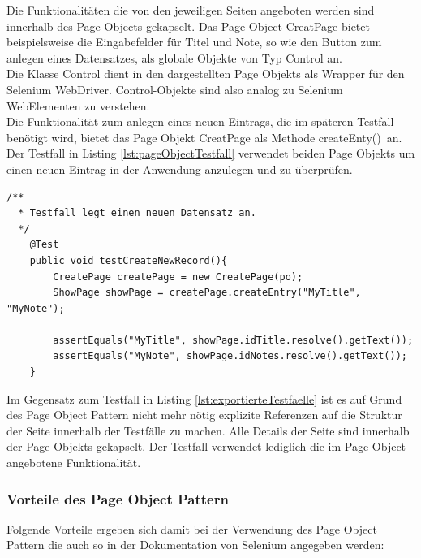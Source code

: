 Die Funktionalitäten die von den jeweiligen Seiten angeboten werden sind innerhalb des Page Objects gekapselt. Das Page Object CreatPage bietet beispielsweise die Eingabefelder für Titel und Note, so wie den Button zum anlegen eines Datensatzes, als globale Objekte von Typ Control an.\\
Die Klasse Control dient in den dargestellten Page Objekts als Wrapper für den Selenium WebDriver. Control-Objekte sind also analog zu Selenium WebElementen zu verstehen.\\
Die Funktionalität zum anlegen eines neuen Eintrags, die im späteren Testfall benötigt wird, bietet das Page Objekt CreatPage als Methode \grq createEnty()\grq\ an.\\

Der Testfall in Listing \ref{lst:pageObjectTestfall} verwendet beiden Page Objekts um einen neuen Eintrag in der Anwendung anzulegen und zu überprüfen.


\begin{lstlisting}[caption={Page Object Testfall},label={lst:pageObjectTestfall}]  
  /**
  * Testfall legt einen neuen Datensatz an.
  */
 	@Test
	public void testCreateNewRecord(){
		CreatePage createPage = new CreatePage(po);
		ShowPage showPage = createPage.createEntry("MyTitle", "MyNote");

		assertEquals("MyTitle", showPage.idTitle.resolve().getText());
		assertEquals("MyNote", showPage.idNotes.resolve().getText());
	}

\end{lstlisting}

Im Gegensatz zum Testfall in Listing \ref{lst:exportierteTestfaelle} ist es auf Grund des Page Object Pattern nicht mehr nötig explizite Referenzen auf die Struktur der Seite innerhalb der Testfälle zu machen. Alle Details der Seite sind innerhalb der Page Objekts gekapselt. Der Testfall verwendet lediglich die im Page Object angebotene Funktionalität.


\subsubsection{Vorteile des Page Object Pattern}
\label{sec:vorteile_des_page_object_pattern}

Folgende Vorteile ergeben sich damit bei der Verwendung des Page Object Pattern die auch so in der Dokumentation von Selenium \cite{selenium_selenium_2015-2} angegeben werden:

